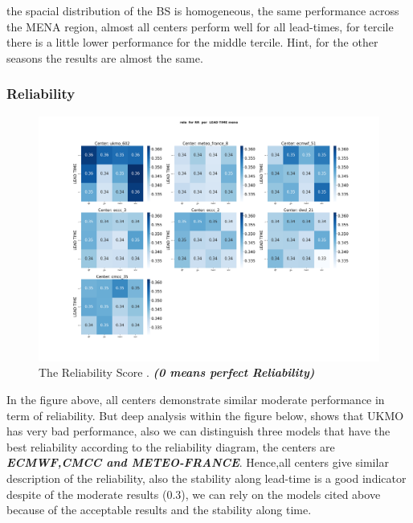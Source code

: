 the spacial distribution of the BS is homogeneous, the same performance across the MENA region, almost all centers perform well for all lead-times, for  tercile there is a little lower performance for the middle tercile.
Hint, for the other seasons the results are almost the same. 


\subsubsection{Reliability}

\begin{figure}[H]
    \centering
    \includegraphics[scale=0.25]{plots/prob/rela/rela_RR_mena.png}
    \caption{The Reliability Score  . \textbf{\textit{(0 means perfect Reliability)}}}
\end{figure}

In the figure above, all centers demonstrate similar moderate performance in term of reliability. But deep analysis within the figure below, shows that UKMO has very bad performance, also we can distinguish three models that have the best reliability according to the reliability diagram, the centers are \textbf{\textit{ECMWF,CMCC and METEO-FRANCE}}. Hence,all centers give similar description of the reliability, also the stability along lead-time is a good indicator despite of the moderate results (0.3), we can rely on the models cited above because of the acceptable results and the stability along time.

